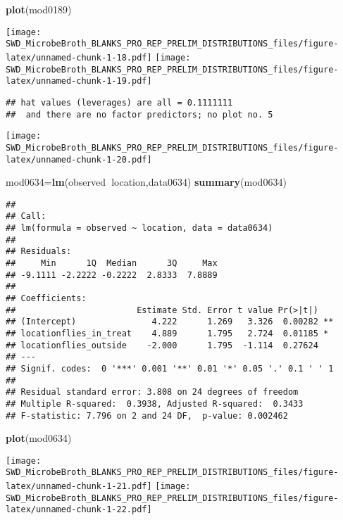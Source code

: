 \documentclass[]{article}
\newenvironment{Shaded}{\begin{snugshade}}{\end{snugshade}}
\newcommand{\KeywordTok}[1]{\textcolor[rgb]{0.13,0.29,0.53}{\textbf{#1}}}
\newcommand{\OperatorTok}[1]{\textcolor[rgb]{0.81,0.36,0.00}{\textbf{#1}}}
\newcommand{\NormalTok}[1]{#1}
\begin{document}
\begin{Shaded}
\begin{Highlighting}[]
\KeywordTok{plot}\NormalTok{(mod0189)}
\end{Highlighting}
\end{Shaded}

\texttt{[image: SWD\_MicrobeBroth\_BLANKS\_PRO\_REP\_PRELIM\_DISTRIBUTIONS\_files/figure-latex/unnamed-chunk-1-18.pdf]}
\texttt{[image: SWD\_MicrobeBroth\_BLANKS\_PRO\_REP\_PRELIM\_DISTRIBUTIONS\_files/figure-latex/unnamed-chunk-1-19.pdf]}

\begin{verbatim}
## hat values (leverages) are all = 0.1111111
##  and there are no factor predictors; no plot no. 5
\end{verbatim}

\texttt{[image: SWD\_MicrobeBroth\_BLANKS\_PRO\_REP\_PRELIM\_DISTRIBUTIONS\_files/figure-latex/unnamed-chunk-1-20.pdf]}

\begin{Shaded}
\begin{Highlighting}[]
\NormalTok{mod0634=}\KeywordTok{lm}\NormalTok{(observed}\OperatorTok{~}\NormalTok{location,data0634)}
\KeywordTok{summary}\NormalTok{(mod0634)}
\end{Highlighting}
\end{Shaded}

\begin{verbatim}
## 
## Call:
## lm(formula = observed ~ location, data = data0634)
## 
## Residuals:
##     Min      1Q  Median      3Q     Max 
## -9.1111 -2.2222 -0.2222  2.8333  7.8889 
## 
## Coefficients:
##                        Estimate Std. Error t value Pr(>|t|)   
## (Intercept)               4.222      1.269   3.326  0.00282 **
## locationflies_in_treat    4.889      1.795   2.724  0.01185 * 
## locationflies_outside    -2.000      1.795  -1.114  0.27624   
## ---
## Signif. codes:  0 '***' 0.001 '**' 0.01 '*' 0.05 '.' 0.1 ' ' 1
## 
## Residual standard error: 3.808 on 24 degrees of freedom
## Multiple R-squared:  0.3938, Adjusted R-squared:  0.3433 
## F-statistic: 7.796 on 2 and 24 DF,  p-value: 0.002462
\end{verbatim}

\begin{Shaded}
\begin{Highlighting}[]
\KeywordTok{plot}\NormalTok{(mod0634)}
\end{Highlighting}
\end{Shaded}

\texttt{[image: SWD\_MicrobeBroth\_BLANKS\_PRO\_REP\_PRELIM\_DISTRIBUTIONS\_files/figure-latex/unnamed-chunk-1-21.pdf]}
\texttt{[image: SWD\_MicrobeBroth\_BLANKS\_PRO\_REP\_PRELIM\_DISTRIBUTIONS\_files/figure-latex/unnamed-chunk-1-22.pdf]}
\end{document}
